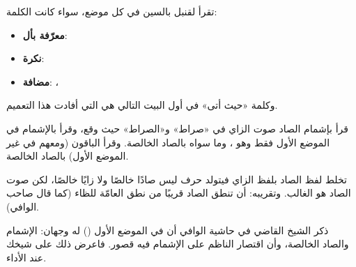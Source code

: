 \begin{qaida}
تقرأ لقنبل بالسين في كل موضع، سواء كانت الكلمة:
\begin{itemize}
\item \textbf{معرّفة بأل}:  
\item \textbf{نكرة}:  
\item \textbf{مضافة}:  ،  
\end{itemize}
وكلمة «حيث أتى» في أول البيت التالي هي التي أفادت هذا التعميم.
\end{qaida}


\begin{mufradat}
\end{mufradat}

\maana
قرأ \Khalaf{} بإشمام الصاد صوت الزاي في «صراط» و«الصراط» حيث وقع، وقرأ \Khallad{} بالإشمام في الموضع الأول فقط وهو ، وما سواه بالصاد الخالصة.
وقرأ الباقون (ومعهم \Khallad{} في غير الموضع الأول) بالصاد الخالصة.

\begin{qiraat}
\end{qiraat}

\begin{qaida}
تخلط لفظ الصاد بلفظ الزاي فيتولد حرف ليس صادًا خالصًا ولا زايًا خالصًا، لكن صوت الصاد هو الغالب.
وتقريبه: أن تنطق الصاد قريبًا من نطق العامّة للظاء (كما قال صاحب الوافي).
\end{qaida}

\begin{tanbih}
ذكر الشيخ القاضي في حاشية الوافي أن \Khallad{} في الموضع الأول () له وجهان: الإشمام والصاد الخالصة، وأن اقتصار الناظم على الإشمام فيه قصور. فاعرض ذلك على شيخك عند الأداء.
\end{tanbih}

